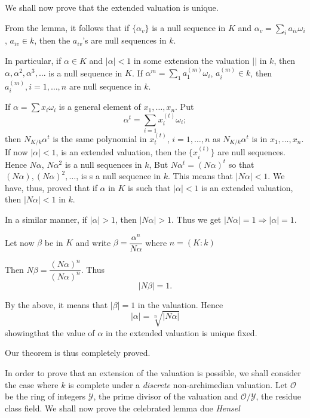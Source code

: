 We shall now prove that the extended valuation is unique.

From the lemma, it follows that if $\{ \alpha _v\}$ is a  null
sequence in $K$ and $\alpha _v = \sum\limits_i a_{iv} \omega_i$, $a_{iv}
\in k $, then the $ a_{iv}$'s are null sequences in $k$.  

In particular, if $\alpha \in K$ and $|\alpha| < 1$ in some extension
the valuation $||$ in $k$, then $\alpha, \alpha^2, \alpha^3 , \ldots$
is a null sequence in $K$. If $\alpha^m=\sum\limits_1
a_1^{(m)}\omega_i$, $a_i^{(m)}\in k$, then $a_i^{(m)}, i=1,\ldots, n$
are null sequence in $k$. 


If $\alpha = \sum x_i \omega_i $ is a general element of $ x_1, \ldots
, x_n $. Put  
$$
\alpha ^t = \sum_{ i = 1} x_i ^{(t)} \omega_i ;  
$$
then $N_{K/k} \alpha^t$ is the same polynomial in $x_t ^{(t)}$, 
$i = 1 , \ldots , n $ as $N_{K/k} \alpha^t $ is in $x_1, \ldots ,
x_n$. If now $|\alpha | < 1$, is an extended valuation, then the $\{
x_i^(t)\}$ are null sequences. Hence $N\alpha$, $N\alpha^2 $ is a null
sequences in $k$, But $N \alpha ^t  = (N \alpha )^t $ so that $(N
\alpha ), (N \alpha )^2 , \ldots  $,  is s a null sequence in $k$.
   This means that $|N \alpha | < 1$. We have, thus, proved that if
   $\alpha$ in $K$ is such that $|\alpha|<1$ is an extended valuation,
   then $|N \alpha| < 1$ in $k$.  

In a similar manner, if $  |\alpha | > 1$, then $|N \alpha | >
1$. Thus we get $|N\alpha| = 1 \Rightarrow |\alpha | = 1$. 

Let now $\beta$ be in $K$ and write $\beta = \dfrac{\alpha ^n}{N
  \alpha}$ where $ n = (K : k )$  

Then $N \beta = \dfrac{(N \alpha )^n}{(N \alpha )^n}$. Thus 
$$
|N \beta | = 1 . 
$$

By the above, it means that $|\beta| = 1 $ in the valuation. Hence  
$$
|\alpha| = \sqrt[n]{|N \alpha |} 
$$
showing\pageoriginale that the value of $\alpha$ in the extended
valuation is unique fixed.   

Our theorem is thus completely proved. 


In order to prove that an extension of the valuation is possible, we
shall consider the case where $k$ is complete under a \textit{discrete}\break
non-archimedian valuation. Let $\mathscr{O}$ be the  ring of 
integers $\mathscr{Y}$, the prime divisor of the valuation and
$\mathscr{O}/\mathscr{Y}$, the residue class field. We shall now
prove the celebrated lemma due \textit{Hensel}  

